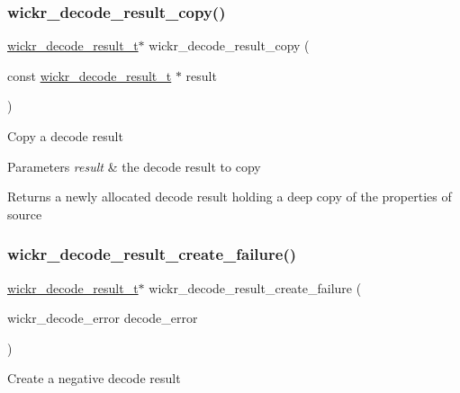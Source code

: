 \subsubsection{\texorpdfstring{wickr\+\_\+decode\+\_\+result\+\_\+copy()}{wickr\_decode\_result\_copy()}}
{\footnotesize\ttfamily \mbox{\hyperlink{structwickr__decode__result}{wickr\+\_\+decode\+\_\+result\+\_\+t}}$\ast$ wickr\+\_\+decode\+\_\+result\+\_\+copy (\begin{DoxyParamCaption}\item[{const \mbox{\hyperlink{structwickr__decode__result}{wickr\+\_\+decode\+\_\+result\+\_\+t}} $\ast$}]{result }\end{DoxyParamCaption})}

Copy a decode result


\begin{DoxyParams}{Parameters}
{\em result} & the decode result to copy \\
\hline
\end{DoxyParams}
\begin{DoxyReturn}{Returns}
a newly allocated decode result holding a deep copy of the properties of \textquotesingle{}source\textquotesingle{} 
\end{DoxyReturn}
\mbox{\label{group__wickr__protocol_ga2bd6f49ed993d2290aaafa514eba43ed}} 
\subsubsection{\texorpdfstring{wickr\+\_\+decode\+\_\+result\+\_\+create\+\_\+failure()}{wickr\_decode\_result\_create\_failure()}}
{\footnotesize\ttfamily \mbox{\hyperlink{structwickr__decode__result}{wickr\+\_\+decode\+\_\+result\+\_\+t}}$\ast$ wickr\+\_\+decode\+\_\+result\+\_\+create\+\_\+failure (\begin{DoxyParamCaption}\item[{wickr\+\_\+decode\+\_\+error}]{decode\+\_\+error }\end{DoxyParamCaption})}

Create a negative decode result


